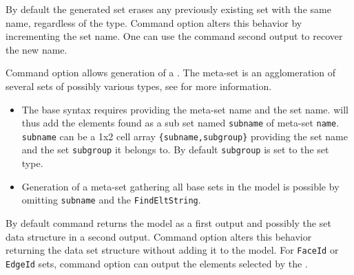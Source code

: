 \begin{SDT}
By default the generated set erases any previously existing set with the same name, regardless of the type. Command option  alters this behavior by incrementing the set name. One can use the command second output to recover the new name.
\end{SDT}

\vs

Command option  allows generation of a . The meta-set is an agglomeration of several sets of possibly various types, see  for more information.
\begin{itemize}
\item The base syntax requires providing the meta-set name and the set name.  will thus add the elements found as a sub set named {\tt subname} of meta-set {\tt name}. {\tt subname} can be a 1x2 cell array {\tt \{subname,subgroup\}} providing the set name and the set {\tt subgroup} it belongs to. By default {\tt subgroup} is set to the set type.

\item Generation of a meta-set gathering all base sets in the model is possible by omitting {\tt subname} and the {\tt FindEltString}.
\end{itemize}

\vs

By default command  returns the model as a first output and possibly the set data structure in a second output. Command option  alters this behavior returning the data set structure without adding it to the model. For {\tt FaceId} or {\tt EdgeId} sets, command option  can output the elements selected by the \hyperlink{findelt}{}.

